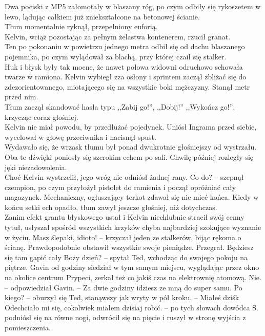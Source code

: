 \documentclass[../MAIN.tex]{subfiles}
\begin{document}
Dwa pociski z MP5 załomotały w blaszany róg, po czym odbiły się rykoszetem w lewo, lądując całkiem już zniekształcone na betonowej ścianie.\\
Tłum momentalnie ryknął, przepełniony euforią.\\
Kelvin, wciąż pozostając za pełnym żelastwa kontenerem, rzucił granat.\\
Ten po pokonaniu w powietrzu jednego metra odbił się od dachu blaszanego pojemnika, po czym wylądował za blachą, przy której czaił się stalker.\\
Huk i błysk były tak mocne, że nawet połowa widowni odruchowo schowała twarze w ramiona. Kelvin wybiegł zza osłony i sprintem zaczął zbliżać się do zdezorientowanego, miotającego się na wszystkie boki mężczyzny. Stanął metr przed nim.\\
Tłum zaczął skandować hasła typu ,,Zabij go!'', ,,Dobij!'' ,,Wykończ go!'', krzycząc coraz głośniej.\\
Kelvin nie miał powodu, by przedłużać pojedynek. Uniósł Ingrama przed siebie, wycelował w głowę przeciwnika i nacisnął spust.\\
Wydawało się, że wrzask tłumu był ponad dwukrotnie głośniejszy od wystrzału. Oba te dźwięki poniosły się szerokim echem po sali. Chwilę później rozległy się jęki niezadowolenia.\\
Choć Kelvin wystrzelił, jego wróg nie odniósł żadnej rany.
\sx Co do? -- szepnął czempion, po czym przyłożył pistolet do ramienia i począł opróżniać cały magazynek.
\qd
Mechaniczny, ogłuszający terkot zdawał się nie mieć końca. Kiedy w końcu setki ech opadło, tłum zawył jeszcze głośniej, niż dotychczas.\\
Zanim efekt grantu błyskowego ustał i Kelvin niechlubnie stracił swój cenny tytuł, usłyszał spośród wszystkich krzyków chyba najbardziej szokujące wyznanie w życiu.
\sx Masz ślepaki, idioto! -- krzyczał jeden ze stalkerów, bijąc rękoma o ścianę. Prawdopodobnie obstawił wszystkie swoje pieniądze. Przegrał.
\qd\dd\sx
Będziesz się tam gapić cały Boży dzień? -- spytał Ted, wchodząc do swojego pokoju na piętrze.
\qd
Gavin od godziny siedział w tym samym miejscu, wyglądając przez okno na okolice centrum Prypeci, zerkał też co jakiś czas na elektrownię atomową.
\sx Nie. -- odpowiedział Gavin. -- Za dwie godziny idziesz ze mną do super samu.
\xx Po kiego? -- oburzył się Ted, stanąwszy jak wryty w pół kroku. -- Miałeś dziś\3k
\xx Odechciało mi się, cokolwiek miałem dzisiaj robić. -- po tych słowach dowódca S. podniósł się na równe nogi, odwrócił się na pięcie i ruszył w stronę wyjścia z pomieszczenia.
\end{document}
